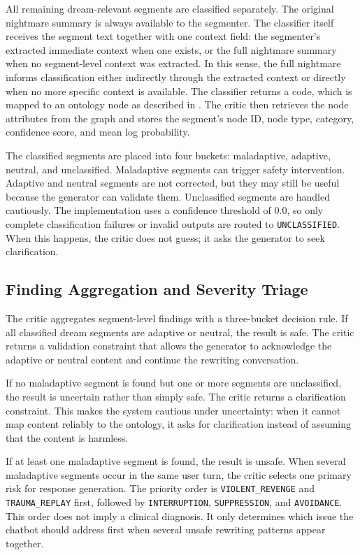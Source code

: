 All remaining dream-relevant segments are classified separately. The original nightmare summary is always available to the segmenter. The classifier itself receives the segment text together with one context field: the segmenter's extracted immediate context when one exists, or the full nightmare summary when no segment-level context was extracted. In this sense, the full nightmare informs classification either indirectly through the extracted context or directly when no more specific context is available. The classifier returns a code, which is mapped to an ontology node as described in . The critic then retrieves the node attributes from the graph and stores the segment's node ID, node type, category, confidence score, and mean log probability.

The classified segments are placed into four buckets: maladaptive, adaptive, neutral, and unclassified. Maladaptive segments can trigger safety intervention. Adaptive and neutral segments are not corrected, but they may still be useful because the generator can validate them. Unclassified segments are handled cautiously. The implementation uses a confidence threshold of 0.0, so only complete classification failures or invalid outputs are routed to \texttt{UNCLASSIFIED}. When this happens, the critic does not guess; it asks the generator to seek clarification.

\subsection{Finding Aggregation and Severity Triage}

The critic aggregates segment-level findings with a three-bucket decision rule. If all classified dream segments are adaptive or neutral, the result is safe. The critic returns a validation constraint that allows the generator to acknowledge the adaptive or neutral content and continue the rewriting conversation.

If no maladaptive segment is found but one or more segments are unclassified, the result is uncertain rather than simply safe. The critic returns a clarification constraint. This makes the system cautious under uncertainty: when it cannot map content reliably to the ontology, it asks for clarification instead of assuming that the content is harmless.

If at least one maladaptive segment is found, the result is unsafe. When several maladaptive segments occur in the same user turn, the critic selects one primary risk for response generation. The priority order is \texttt{VIOLENT\_REVENGE} and \texttt{TRAUMA\_REPLAY} first, followed by \texttt{INTERRUPTION}, \texttt{SUPPRESSION}, and \texttt{AVOIDANCE}. This order does not imply a clinical diagnosis. It only determines which issue the chatbot should address first when several unsafe rewriting patterns appear together.

